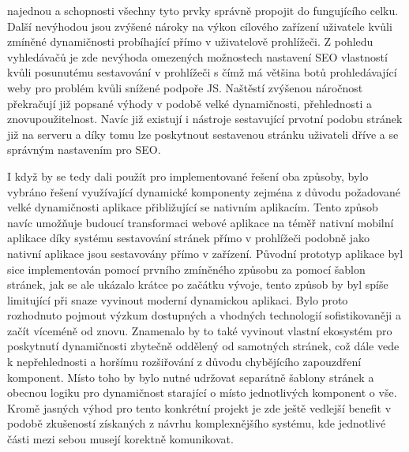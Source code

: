 	najednou a schopnosti všechny tyto prvky správně propojit do fungujícího celku.
	Další nevýhodou jsou zvýšené nároky na výkon cílového zařízení uživatele kvůli zmíněné dynamičnosti probíhající přímo
	v uživatelově prohlížeči.
	Z pohledu vyhledávačů je zde nevýhoda omezených možnostech nastavení \ac{SEO} vlastností kvůli posunutému sestavování
	v prohlížeči s čímž má většina botů prohledávající weby pro problém kvůli snížené podpoře \ac{JS}.
	Naštěstí zvýšenou náročnost překračují již popsané výhody v podobě velké dynamičnosti, přehlednosti a znovupoužitelnost.
	Navíc již existují i nástroje sestavující prvotní podobu stránek již na serveru a díky tomu lze poskytnout sestavenou
	stránku uživateli dříve a se správným nastavením pro \ac{SEO}.

	I když by se tedy dali použít pro implementované řešení oba způsoby, bylo vybráno řešení využívající dynamické komponenty
	zejména z důvodu požadované velké dynamičnosti aplikace přibližující se nativním aplikacím.
	Tento způsob navíc umožňuje budoucí transformaci webové aplikace na téměř nativní mobilní aplikace díky systému
	sestavování stránek přímo v prohlížeči podobně jako nativní aplikace jsou sestavovány přímo v zařízení.
	Původní prototyp aplikace byl sice implementován pomocí prvního zmíněného způsobu za pomocí šablon stránek, jak se
	ale ukázalo krátce po začátku vývoje, tento způsob by byl spíše limitující při snaze vyvinout moderní dynamickou aplikaci.
	Bylo proto rozhodnuto pojmout výzkum dostupných a vhodných technologií sofistikovaněji a začít víceméně od znovu. %
	Znamenalo by to také vyvinout vlastní ekosystém pro poskytnutí dynamičnosti zbytečně oddělený od samotných stránek,
	což dále vede k nepřehlednosti a horšímu rozšiřování z důvodu chybějícího zapouzdření komponent.
	Místo toho by bylo nutné udržovat separátně šablony stránek a obecnou logiku pro dynamičnost starající o místo
	jednotlivých komponent o vše.
	Kromě jasných výhod pro tento konkrétní projekt je zde ještě vedlejší benefit v podobě zkušeností získaných
	z návrhu komplexnějšího systému, kde jednotlivé části mezi sebou musejí korektně komunikovat.



